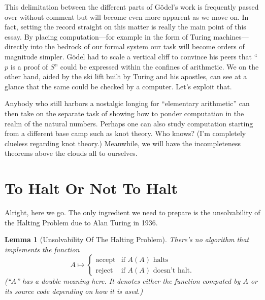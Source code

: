 \documentclass{article}
\newtheorem{lemma}{Lemma}
\begin{document}
This delimitation between the different parts of Gödel's work is frequently passed over without comment but will become even more apparent as we move on. In fact, setting the record straight on this matter is really the main point of this essay. By placing computation---for example in the form of Turing machines---directly into the bedrock of our formal system our task will become orders of magnitude simpler. Gödel had to scale a vertical cliff to convince his peers that ``$p$ is a proof of $S$'' could be expressed within the confines of arithmetic. We on the other hand, aided by the ski lift built by Turing and his apostles, can see at a glance that the same could be checked by a computer. Let's exploit that.

Anybody who still harbors a nostalgic longing for ``elementary arithmetic'' can then take on the separate task of showing how to ponder computation in the realm of the natural numbers. Perhaps one can also study computation starting from a different base camp such as knot theory. Who knows? (I'm completely clueless regarding knot theory.) Meanwhile, we will have the incompleteness theorems above the clouds all to ourselves.

\section{To Halt Or Not To Halt}

Alright, here we go. The only ingredient we need to prepare is the unsolvability of the Halting Problem due to Alan Turing in 1936.

\begin{lemma}[Unsolvability Of The Halting Problem]
There's no algorithm that implements the function
\[
A \mapsto
\begin{cases}
\text{accept} & \text{if $A(A)$ halts}\\
\text{reject} & \text{if $A(A)$ doesn't halt.}
\end{cases}
\]
(``$A$'' has a double meaning here. It denotes either the function computed by $A$ or its source code depending on how it is used.)
\end{lemma}
\end{document}
